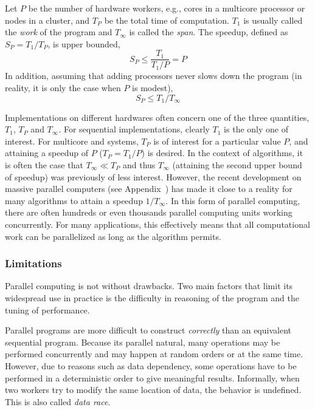 Let $P$ be the number of hardware workers, e.g., cores in a multicore processor or nodes in a cluster, and $T_P$ be the total time of computation. $T_1$ is usually called the \emph{work} of the program and $T_{\infty}$ is called the \emph{span}. The speedup, defined as $S_P = T_1/T_P$, is upper bounded,
\begin{equation}
  S_P \le \frac{T_1}{T_1/P} = P
\end{equation}
In addition, assuming that adding processors never slows down the program (in reality, it is only the case when $P$ is modest),
\begin{equation}
  S_P \le T_1/T_{\infty}
\end{equation}

Implementations on different hardwares often concern one of the three quantities, $T_1$, $T_P$ and $T_{\infty}$. For sequential implementations, clearly $T_1$ is the only one of interest. For multicore and \smp systems, $T_P$ is of interest for a particular value $P$, and attaining a speedup of $P$ ($T_P = T_1 / P$) is desired. In the context of \smc algorithms, it is often the case that $T_{\infty} \ll T_P$ and thus $T_{\infty}$ (attaining the second upper bound of speedup) was previously of less interest. However, the recent development on massive parallel computers (see Appendix~) has made it close to a reality for many algorithms to attain a speedup $1/T_{\infty}$. In this form of parallel computing, there are often hundreds or even thousands parallel computing units working concurrently. For many applications, this effectively means that all computational work can be parallelized as long as the algorithm permits.

\subsubsection{Limitations}
\label{ssub:Limitations}

Parallel computing is not without drawbacks. Two main factors that limit its widespread use in practice is the difficulty in reasoning of the program and the tuning of performance.

Parallel programs are more difficult to construct \emph{correctly} than an equivalent sequential program. Because its parallel natural, many operations may be performed concurrently and may happen at random orders or at the same time. However, due to reasons such as data dependency, some operations have to be performed in a deterministic order to give meaningful results. Informally, when two workers try to modify the same location of data, the behavior is undefined. This is also called \emph{data race}.

